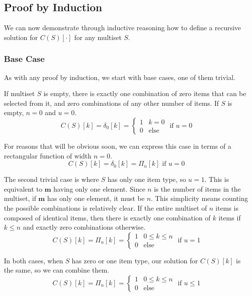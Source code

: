 \documentclass{article}
\begin{document}
\subsection{Proof by Induction}

We can now demonstrate through inductive reasoning how to define a recursive solution for $C(S)[\cdot]$ for any multiset $S$.

\subsubsection{Base Case}

As with any proof by induction, we start with base cases, one of them trivial. 

If multiset $S$ is empty, there is exactly one combination of zero items that can be selected from it, and zero combinations of any other number of items. If $S$ is empty, $n=0$ and $u=0$.
\begin{equation}
    C(S)[k] = \delta_0[k] = \begin{cases}1 & k = 0 \\ 0 & \text{else}  \end{cases} \text{ if } u=0
\end{equation}

For reasons that will be obvious soon, we can express this case in terms of a rectangular function of width $n=0$.
\begin{equation}
    C(S)[k] = \delta_0[k] = \Pi_n[k] \text{ if } u=0
\end{equation}

The second trivial case is where $S$ has only one item type, so $u=1$. This is equivalent to $\bm{m}$ having only one element. Since $n$ is the number of items in the multiset, if $\bm{m}$ has only one element, it must be $n$. This simplicity means counting the possible combinations is relatively clear. If the entire multiset of $n$ items is composed of identical items, then there is exactly one combination of $k$ items if $k \leq n$ and exactly zero combinations otherwise.
\begin{equation}
    C(S)[k] = \Pi_n[k] = \begin{cases}1 & 0 \leq k \leq n \\ 0 & \text{else}  \end{cases}\text{ if } u = 1
\end{equation}

In both cases, when $S$ has zero or one item type, our solution for $C(S)[k]$ is the same, so we can combine them.
\begin{equation}
    C(S)[k] = \Pi_n[k] = \begin{cases}1 & 0 \leq k \leq n \\ 0 & \text{else}  \end{cases}\text{ if } u\leq 1
\end{equation}
\end{document}
